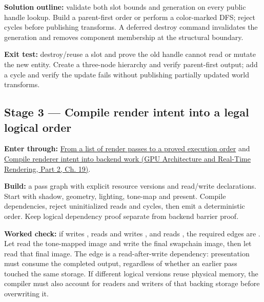 \textbf{Solution outline:} validate both slot bounds and generation on every public handle lookup. Build a parent-first order or perform a color-marked DFS; reject cycles before publishing transforms. A deferred destroy command invalidates the generation and removes component membership at the structural boundary.

\textbf{Exit test:} destroy/reuse a slot and prove the old handle cannot read or mutate the new entity. Create a three-node hierarchy and verify parent-first output; add a cycle and verify the update fails without publishing partially updated world transforms.

\subsection{Stage 3 --- Compile render intent into a legal logical order}\label{06-engine-ii-ch042-stage-3-compile-render-intent-into-a-legal-logical-order}

\hypertarget{06-engine-ii-ch042-stage-3-compile-render-intent-into-a-legal-logical-order}{}

\textbf{Enter through:} \hyperref[06-engine-ii-ch042-from-a-list-of-render-passes-to-a-proved-execution-order]{From a list of render passes to a proved execution order} and \href{../06-GPU-Architecture-and-Real-Time-Rendering-P02/main.pdf\#nameddest=06-engine-ii-ch043-compile-renderer-intent-into-backend-work}{Compile renderer intent into backend work (GPU Architecture and Real-Time Rendering, Part 2, Ch. 19)}.

\textbf{Build:} a pass graph with explicit resource versions and read/write declarations. Start with shadow, geometry, lighting, tone-map and present. Compile dependencies, reject uninitialized reads and cycles, then emit a deterministic order. Keep logical dependency proof separate from backend barrier proof.

\textbf{Worked check:} if  writes ,  reads  and writes , and  reads , the required edges are . Let  read the tone-mapped image and write the final swapchain image, then let  read that final image. The  edge is a read-after-write dependency: presentation must consume the completed output, regardless of whether an earlier pass touched the same storage. If different logical versions reuse physical memory, the compiler must also account for readers and writers of that backing storage before overwriting it.

